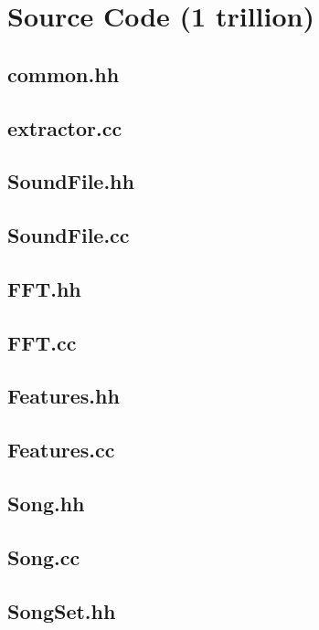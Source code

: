 
\chapter{Source Code (1 trillion)}
\section{common.hh}

\section{extractor.cc}

\section{SoundFile.hh}

\section{SoundFile.cc}

\section{FFT.hh}

\section{FFT.cc}

\section{Features.hh}

\section{Features.cc}

\section{Song.hh}

\section{Song.cc}

\section{SongSet.hh}

